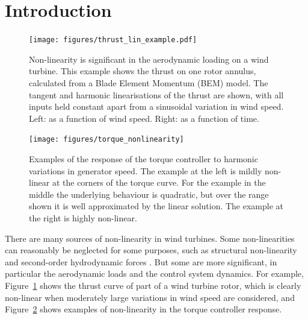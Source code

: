 \documentclass[preprint]{elsarticle}
\begin{document}
\linenumbers

\section{Introduction}
\label{sec:introduction}

\begin{figure}
  \centering
  \texttt{[image: figures/thrust\_lin\_example.pdf]}
  \caption{Non-linearity is significant in the aerodynamic loading on a wind
    turbine. This example shows the thrust on one rotor annulus, calculated from
    a Blade Element Momentum (BEM) model. The tangent and harmonic
    linearisations of the thrust are shown, with all inputs held constant apart
    from a sinusoidal variation in wind speed. Left: as a function of wind
    speed. Right: as a function of time.}
  \label{fig:thrust}
\end{figure}

\begin{figure}
  \centering
  \texttt{[image: figures/torque\_nonlinearity]}
  \caption{Examples of the response of the torque controller to harmonic
    variations in generator speed. The example at the left is mildly non-linear
    at the corners of the torque curve. For the example in the middle the
    underlying behaviour is quadratic, but over the range shown it is well
    approximated by the linear solution. The example at the right is highly
    non-linear.}
\label{fig:torque-nonlinearity}
\end{figure}

There are many sources of non-linearity in wind turbines. Some non-linearities
can reasonably be neglected for some purposes, such as structural non-linearity
\citep{lupton_complex_underreview} and second-order hydrodynamic forces
\citep{lupton_scaling_2017}. But some are more significant, in particular the
aerodynamic loads and the control system dynamics. For example,
Figure~\ref{fig:thrust} shows the thrust curve of part of a wind turbine rotor,
which is clearly non-linear when moderately large variations in wind speed are
considered, and Figure~\ref{fig:torque-nonlinearity} shows examples of
non-linearity in the torque controller response.
\end{document}
